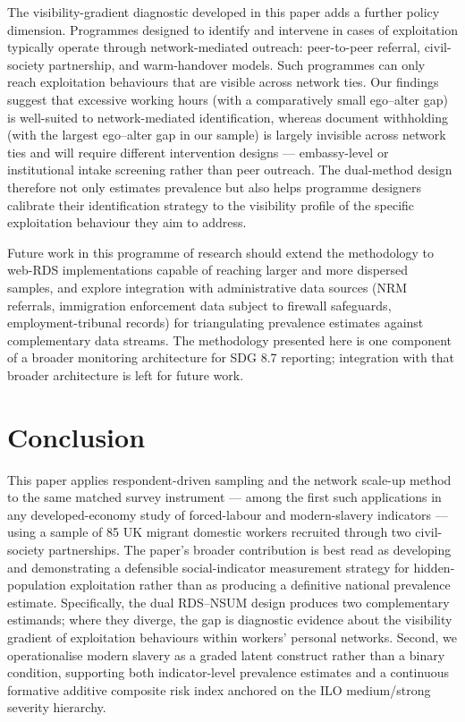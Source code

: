 \documentclass[
  12pt,
  letterpaper,
  DIV=11,
  numbers=noendperiod]{scrartcl}
\begin{document}
The visibility-gradient diagnostic developed in this paper adds a
further policy dimension. Programmes designed to identify and intervene
in cases of exploitation typically operate through network-mediated
outreach: peer-to-peer referral, civil-society partnership, and
warm-handover models. Such programmes can only reach exploitation
behaviours that are visible across network ties. Our findings suggest
that excessive working hours (with a comparatively small ego--alter gap)
is well-suited to network-mediated identification, whereas document
withholding (with the largest ego--alter gap in our sample) is largely
invisible across network ties and will require different intervention
designs --- embassy-level or institutional intake screening rather than
peer outreach. The dual-method design therefore not only estimates
prevalence but also helps programme designers calibrate their
identification strategy to the visibility profile of the specific
exploitation behaviour they aim to address.

Future work in this programme of research should extend the methodology
to web-RDS implementations capable of reaching larger and more dispersed
samples, and explore integration with administrative data sources (NRM
referrals, immigration enforcement data subject to firewall safeguards,
employment-tribunal records) for triangulating prevalence estimates
against complementary data streams. The methodology presented here is
one component of a broader monitoring architecture for SDG 8.7
reporting; integration with that broader architecture is left for future
work.

\section{Conclusion}\label{conclusion}

This paper applies respondent-driven sampling and the network scale-up
method to the same matched survey instrument --- among the first such
applications in any developed-economy study of forced-labour and
modern-slavery indicators --- using a sample of 85 UK migrant domestic
workers recruited through two civil-society partnerships. The paper's
broader contribution is best read as developing and demonstrating a
defensible social-indicator measurement strategy for hidden-population
exploitation rather than as producing a definitive national prevalence
estimate. Specifically, the dual RDS--NSUM design produces two
complementary estimands; where they diverge, the gap is diagnostic
evidence about the visibility gradient of exploitation behaviours within
workers' personal networks. Second, we operationalise modern slavery as
a graded latent construct rather than a binary condition, supporting
both indicator-level prevalence estimates and a continuous formative
additive composite risk index anchored on the ILO medium/strong severity
hierarchy.
\end{document}
